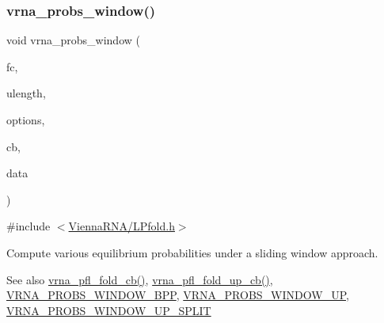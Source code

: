 \subsubsection{\texorpdfstring{vrna\+\_\+probs\+\_\+window()}{vrna\_probs\_window()}}
{\footnotesize\ttfamily void vrna\+\_\+probs\+\_\+window (\begin{DoxyParamCaption}\item[{\mbox{\hyperlink{group__fold__compound_ga1b0cef17fd40466cef5968eaeeff6166}{vrna\+\_\+fold\+\_\+compound\+\_\+t}} $\ast$}]{fc,  }\item[{int}]{ulength,  }\item[{unsigned int}]{options,  }\item[{\mbox{\hyperlink{_l_pfold_8h_abe710a1182e6db69cc75329dfc9bed67}{vrna\+\_\+probs\+\_\+window\+\_\+callback}} $\ast$}]{cb,  }\item[{void $\ast$}]{data }\end{DoxyParamCaption})}



{\ttfamily \#include $<$\mbox{\hyperlink{_l_pfold_8h}{Vienna\+R\+N\+A/\+L\+Pfold.\+h}}$>$}



Compute various equilibrium probabilities under a sliding window approach. 

\begin{DoxySeeAlso}{See also}
\mbox{\hyperlink{group__local__pf__fold_ga8dc3788e66420f524f2bfc0b685a939d}{vrna\+\_\+pfl\+\_\+fold\+\_\+cb()}}, \mbox{\hyperlink{group__local__pf__fold_ga8958d91b1f1aebfb32b58805d141ccf3}{vrna\+\_\+pfl\+\_\+fold\+\_\+up\+\_\+cb()}}, \mbox{\hyperlink{group__local__pf__fold_ga296217b76e76e5f7e6927e7210aa9b1f}{V\+R\+N\+A\+\_\+\+P\+R\+O\+B\+S\+\_\+\+W\+I\+N\+D\+O\+W\+\_\+\+B\+PP}}, \mbox{\hyperlink{group__local__pf__fold_ga18325811c7dfc7b7d9d4ac37f4353615}{V\+R\+N\+A\+\_\+\+P\+R\+O\+B\+S\+\_\+\+W\+I\+N\+D\+O\+W\+\_\+\+UP}}, \mbox{\hyperlink{group__local__pf__fold_ga9068f4ec008bf1c042a9357f5c2c5e13}{V\+R\+N\+A\+\_\+\+P\+R\+O\+B\+S\+\_\+\+W\+I\+N\+D\+O\+W\+\_\+\+U\+P\+\_\+\+S\+P\+L\+IT}}
\end{DoxySeeAlso}

